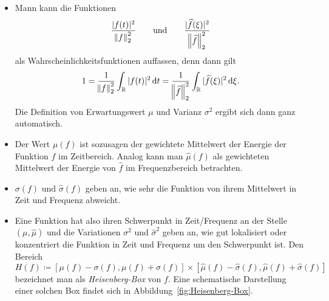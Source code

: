 \begin{remark}  \leavevmode
\begin{itemize}
\item Mann kann die Funktionen
  \[
    \frac{|f(t)|^{2}}{\norm{f}_{2}^{2}} \qquad \text{und} \qquad
    \frac{|\widehat{f}(\xi)|^{2}}{\norm{\widehat{f}}_{2}^{2}}
  \]
  als Wahrscheinlichkeitsfunktionen auffassen, denn dann gilt
  \[
    1 = \frac{1}{\norm{f}_{2}^{2}} \int_{\R} |f(t)|^{2} \dif t
      = \frac{1}{\norm{\widehat{f}}_{2}^{2}} \int_{\R} |\widehat{f}(\xi)|^{2} \dif \xi.
  \]
  Die Definition von Erwartungswert $ \mu $ und Varianz $ \sigma^{2} $ ergibt sich dann ganz
  automatisch.
\item Der Wert $ \mu(f) $ ist sozusagen der gewichtete Mittelwert der Energie der Funktion $ f $ im
  Zeitbereich. Analog kann man $ \widehat{\mu}(f) $ als gewichteten Mittelwert der Energie von
  $ \widehat{f} $ im Frequenzbereich betrachten.
\item $ \sigma(f) $ und $ \widehat{\sigma}(f) $ geben an, wie sehr die Funktion von ihrem Mittelwert
  in Zeit und Frequenz abweicht.
\item Eine Funktion hat also ihren Schwerpunkt in Zeit/Frequenz an der Stelle $ (\mu, 
  \widehat{\mu}) $ und die Variationen $ \sigma^{2} $ und $ \widehat{\sigma}^{2} $ geben an, wie 
  gut lokalisiert oder konzentriert die Funktion in Zeit und Frequenz um den Schwerpunkt ist. Den 
  Bereich
  \[
    H(f) \coloneqq 
      [\mu(f) - \sigma(f), \mu(f) + \sigma(f)] \times
      [\widehat{\mu}(f) - \widehat{\sigma}(f), \widehat{\mu}(f) + \widehat{\sigma}(f)]
  \]
  bezeichnet man als \emph{Heisenberg-Box} von $ f $. Eine schematische Darstellung einer solchen
  Box findet sich in Abbildung~\ref{fig:Heisenberg-Box}.
\end{itemize}


\end{remark}
